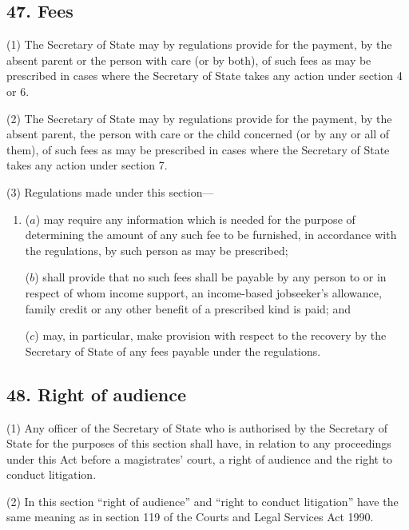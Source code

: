\documentclass[12pt,a4paper]{article}
\begin{document}
\subsection{47. Fees}

(1) The Secretary of State may by regulations provide for the payment, by the absent parent or the person with care (or by both), of such fees as may be prescribed in cases where the Secretary of State takes any action under section 4 or 6.

(2) The Secretary of State may by regulations provide for the payment, by the absent parent, the person with care or the child concerned (or by any or all of them), of such fees as may be prescribed in cases where the Secretary of State takes any action under section 7.

(3) Regulations made under this section—
\begin{enumerate}\item[]
($a$) may require any information which is needed for the purpose of determining the amount of any such fee to be furnished, in accordance with the regulations, by such person as may be prescribed;

($b$) shall provide that no such fees shall be payable by any person to or in respect of whom income support, 
an income-based jobseeker’s allowance,  %
family credit or any other benefit of a prescribed kind is paid; and

($c$) may, in particular, make provision with respect to the recovery by the Secretary of State of any fees payable under the regulations.
\end{enumerate}


\subsection{48. Right of audience}

(1) Any 
officer of the Secretary of State who is authorised  %
by the Secretary of State for the purposes of this section shall have, in relation to any proceedings under this Act before a magistrates' court, a right of audience and the right to conduct litigation.

(2) In this section “right of audience” and “right to conduct litigation” have the same meaning as in section 119 of the Courts and Legal Services Act 1990.
\end{document}
